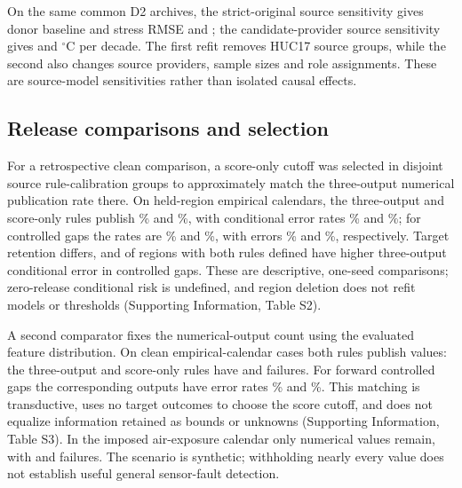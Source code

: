 \documentclass[draft,linenumbers]{agujournal2025}
\begin{document}
On the same \SDSCases{} common D2 archives, the strict-original source sensitivity gives donor baseline and stress RMSE \SDSStrictBase{} and \SDSStrictDonor{}; the candidate-provider source sensitivity gives \SDSCandidateBase{} and \SDSCandidateDonor{} $^{\circ}$C per decade. The first refit removes HUC17 source groups, while the second also changes source providers, sample sizes and role assignments. These are source-model sensitivities rather than isolated causal effects.

\subsection{Release comparisons and selection}
For a retrospective clean comparison, a score-only cutoff was selected in disjoint source rule-calibration groups to approximately match the three-output numerical publication rate there. On held-region empirical calendars, the three-output and score-only rules publish \SRCThreeRetention\% and \SRCScoreRetention\%, with conditional error rates \SRCThreeRisk\% and \SRCScoreRisk\%; for controlled gaps the rates are \SRCGapThreeRetention\% and \SRCGapScoreRetention\%, with errors \SRCGapThreeRisk\% and \SRCGapScoreRisk\%, respectively. Target retention differs, and \RGGapPositive{} of \RGGapDefined{} regions with both rules defined have higher three-output conditional error in controlled gaps. These are descriptive, one-seed comparisons; zero-release conditional risk is undefined, and region deletion does not refit models or thresholds (Supporting Information, Table S2).

A second comparator fixes the numerical-output count using the evaluated feature distribution. On clean empirical-calendar cases both rules publish \MRCount{} values: the three-output and score-only rules have \MRThreeBad{} and \MRScoreBad{} failures. For forward controlled gaps the corresponding \MRFutureCount{} outputs have error rates \MRFutureThree\% and \MRFutureScore\%. This matching is transductive, uses no target outcomes to choose the score cutoff, and does not equalize information retained as bounds or unknowns (Supporting Information, Table S3). In the imposed air-exposure calendar only \MRAirCount{} numerical values remain, with \MRAirThreeBad{} and \MRAirScoreBad{} failures. The scenario is synthetic; withholding nearly every value does not establish useful general sensor-fault detection.
\end{document}

